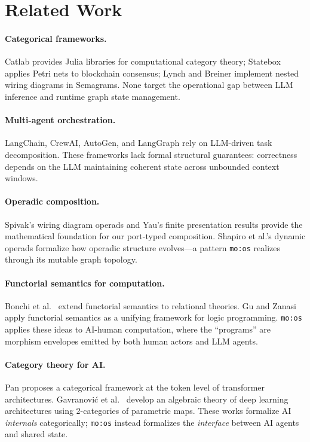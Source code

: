 \documentclass[submission,copyright,creativecommons]{eptcs}
\begin{document}
\section{Related Work}
\label{sec:related}

\paragraph{Categorical frameworks.}
Catlab \cite{catlab2024} provides Julia libraries for computational category
theory; Statebox \cite{statebox2019} applies Petri nets to blockchain
consensus; Lynch and Breiner \cite{lynch2023nested} implement nested wiring
diagrams in Semagrams. None target the operational gap between LLM inference
and runtime graph state management.

\paragraph{Multi-agent orchestration.}
LangChain, CrewAI, AutoGen, and LangGraph rely on LLM-driven task
decomposition. These frameworks lack formal structural guarantees: correctness
depends on the LLM maintaining coherent state across unbounded context windows.

\paragraph{Operadic composition.}
Spivak's wiring diagram operads \cite{spivak2013,spivak2013operad} and Yau's
finite presentation results \cite{yau2018} provide the mathematical foundation
for our port-typed composition. Shapiro et al.'s dynamic operads
\cite{shapiro2022} formalize how operadic structure evolves---a pattern
\texttt{mo:os} realizes through its mutable graph topology.

\paragraph{Functorial semantics for computation.}
Bonchi et al.\ \cite{bonchi2017functorial} extend functorial semantics to
relational theories. Gu and Zanasi \cite{gu2021functorial} apply functorial
semantics as a unifying framework for logic programming. \texttt{mo:os}
applies these ideas to AI-human computation, where the ``programs'' are
morphism envelopes emitted by both human actors and LLM agents.

\paragraph{Category theory for AI.}
Pan \cite{pan2024token} proposes a categorical framework at the token level of
transformer architectures. Gavranovi{\'c} et al.\ \cite{gavranovic2024categorical}
develop an algebraic theory of deep learning architectures using 2-categories
of parametric maps. These works formalize AI \emph{internals} categorically;
\texttt{mo:os} instead formalizes the \emph{interface} between AI agents and
shared state.
\end{document}
